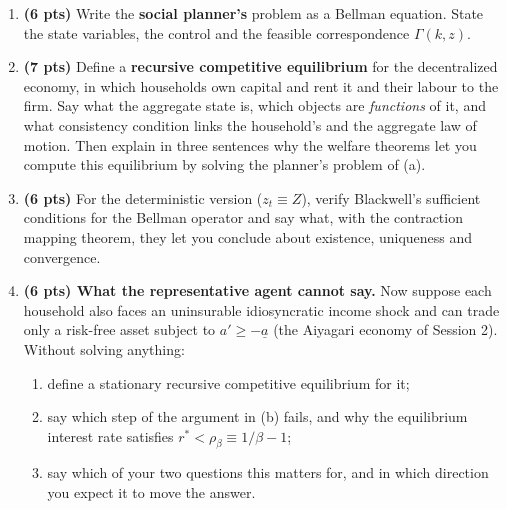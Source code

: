 \documentclass[11pt]{article}
\newif\ifsolutions \solutionsfalse
\newcommand{\solution}[1]{\ifsolutions\medskip
  {\color{blue!45!black}\textbf{Solution.} #1}\medskip\fi}
\begin{document}
\begin{enumerate}[label=(\alph*), leftmargin=*]

\item \textbf{(6 pts)} Write the \textbf{social planner's} problem as a Bellman equation. State the
state variables, the control and the feasible correspondence $\Gamma(k,z)$.

\solution{\keyAone}

\item \textbf{(7 pts)} Define a \textbf{recursive competitive equilibrium} for the decentralized
economy, in which households own capital and rent it and their labour to the firm. Say what the
aggregate state is, which objects are \emph{functions} of it, and what consistency condition links
the household's and the aggregate law of motion. Then explain in three sentences why the welfare
theorems let you compute this equilibrium by solving the planner's problem of (a).

\solution{\keyAtwo}

\item \textbf{(6 pts)} For the deterministic version ($z_t\equiv Z$), verify Blackwell's sufficient
conditions for the Bellman operator and say what, with the contraction mapping theorem, they let you
conclude about existence, uniqueness and convergence.

\solution{\keyAthree}

\item \textbf{(6 pts) What the representative agent cannot say.} Now suppose each household also
faces an uninsurable idiosyncratic income shock and can trade only a risk-free asset subject to
$a'\ge-\underline a$ (the Aiyagari economy of Session 2). Without solving anything:
\begin{enumerate}[label=(\roman*)]
  \item define a stationary recursive competitive equilibrium for it;
  \item say which step of the argument in (b) fails, and why the equilibrium interest rate
        satisfies $r^*<\rho_\beta\equiv1/\beta-1$;
  \item say which of your two questions this matters for, and in which direction you expect it to
        move the answer.
\end{enumerate}

\solution{\keyAfour}

\end{enumerate}

\end{document}
